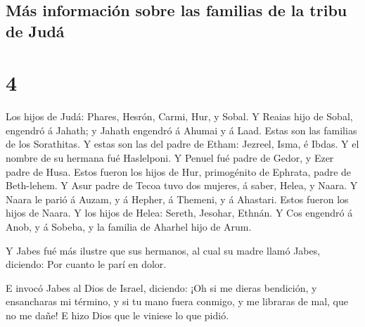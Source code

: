 \hypertarget{muxe1s-informaciuxf3n-sobre-las-familias-de-la-tribu-de-juduxe1}{%
\subsection{Más información sobre las familias de la tribu de
Judá}\label{muxe1s-informaciuxf3n-sobre-las-familias-de-la-tribu-de-juduxe1}}

\hypertarget{section-3}{%
\section{4}\label{section-3}}

 Los hijos de Judá: Phares, Hesrón, Carmi, Hur, y Sobal.
 Y Reaias hijo de Sobal, engendró á Jahath; y Jahath
engendró á Ahumai y á Laad. Estas son las familias de los Sorathitas.
 Y estas son las del padre de Etham: Jezreel, Isma, é
Ibdas. Y el nombre de su hermana fué Haslelponi.  Y Penuel
fué padre de Gedor, y Ezer padre de Husa. Estos fueron los hijos de Hur,
primogénito de Ephrata, padre de Beth-lehem.  Y Asur padre
de Tecoa tuvo dos mujeres, á saber, Helea, y Naara.  Y
Naara le parió á Auzam, y á Hepher, á Themeni, y á Ahastari. Estos
fueron los hijos de Naara.  Y los hijos de Helea: Sereth,
Jesohar, Ethnán.  Y Cos engendró á Anob, y á Sobeba, y la
familia de Aharhel hijo de Arum.

 Y Jabes fué más ilustre que sus hermanos, al cual su
madre llamó Jabes, diciendo: Por cuanto le parí en dolor.

 E invocó Jabes al Dios de Israel, diciendo: ¡Oh si me
dieras bendición, y ensancharas mi término, y si tu mano fuera conmigo,
y me libraras de mal, que no me dañe! E hizo Dios que le viniese lo que
pidió.

